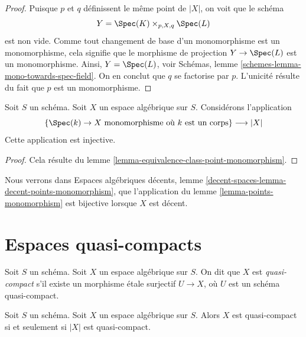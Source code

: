 \begin{proof}
Puisque $p$ et $q$ définissent le même point de $|X|$, on voit que le schéma
$$
Y = \Spec(K) \times_{p, X, q} \Spec(L)
$$
est non vide. Comme tout changement de base d'un monomorphisme est un monomorphisme,
cela signifie que le morphisme de projection $Y \to \Spec(L)$
est un monomorphisme. Ainsi, $Y = \Spec(L)$, voir
Schémas, lemme \ref{schemes-lemma-mono-towards-spec-field}.
On en conclut que $q$ se factorise par $p$. L'unicité
résulte du fait que $p$ est un monomorphisme.
\end{proof}

\begin{lemma}
\label{lemma-points-monomorphism}
Soit $S$ un schéma. Soit $X$ un espace algébrique sur $S$.
Considérons l'application
$$
\{\Spec(k) \to X \text{ monomorphisme où }k\text{ est un corps}\}
\longrightarrow
|X|
$$
Cette application est injective.
\end{lemma}

\begin{proof}
Cela résulte du lemme \ref{lemma-equivalence-class-point-monomorphism}.
\end{proof}

\noindent
Nous verrons dans Espaces algébriques décents,
lemme \ref{decent-spaces-lemma-decent-points-monomorphism},
que l'application du lemme \ref{lemma-points-monomorphism}
est bijective lorsque $X$ est décent.

















\section{Espaces quasi-compacts}
\label{section-quasi-compact}

\begin{definition}
\label{definition-quasi-compact}
Soit $S$ un schéma.
Soit $X$ un espace algébrique sur $S$.
On dit que $X$ est {\it quasi-compact} s'il existe un morphisme
étale surjectif $U \to X$, où $U$ est un schéma quasi-compact.
\end{definition}

\begin{lemma}
\label{lemma-quasi-compact-space}
Soit $S$ un schéma.
Soit $X$ un espace algébrique sur $S$.
Alors $X$ est quasi-compact si et seulement si $|X|$ est quasi-compact.
\end{lemma}

